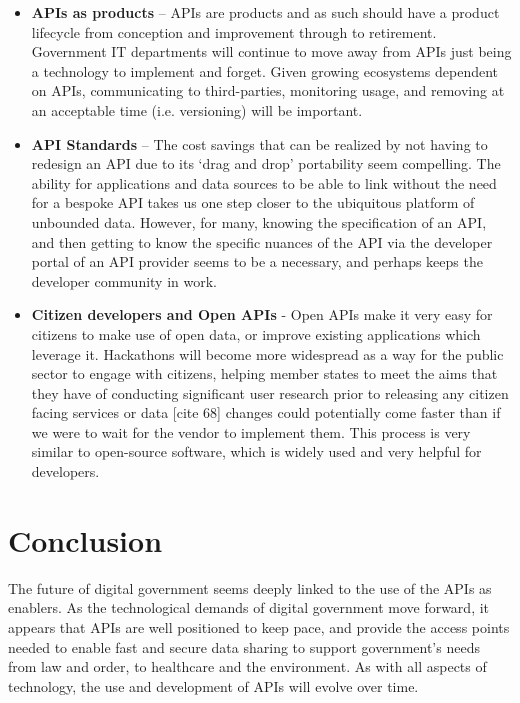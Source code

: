 \begin{itemize}
	\item \textbf{APIs as products} – APIs are products and as such should have a
	product lifecycle from conception and improvement through to retirement.
	Government IT departments will continue to move away from APIs just being
	a technology to implement and forget. Given growing ecosystems dependent
	on APIs, communicating to third-parties, monitoring usage, and removing at
	an acceptable time (i.e. versioning) will be important.
	
	\item \textbf{API Standards} – The cost savings that can be realized by not having
	to redesign an API due to its ‘drag and drop’ portability seem compelling.
	The ability for applications and data sources to be able to link without
	the need for a bespoke API takes us one step closer to the ubiquitous platform
	of unbounded data. However, for many, knowing the specification of an API,
	and then getting to know the specific nuances of the API via the developer
	portal of an API provider seems to be a	necessary, and perhaps keeps the
	developer community in work.
	
	\item \textbf{Citizen developers and Open APIs} - Open APIs make it very easy for
	citizens to make use of	open data, or improve existing applications which
	leverage it. Hackathons will become more widespread as a way for the public
	sector to engage with citizens, helping member states to meet the aims that
	they have of conducting significant user research prior to releasing any
	citizen facing services or data [cite 68] changes could potentially come
	faster than if we were to wait for the vendor to implement them. This process
	is very similar to open-source software, which is widely used and very
	helpful for developers.
\end{itemize}

\section{Conclusion}

The future of digital government seems deeply linked to the use of the APIs as
enablers. As the technological demands of digital government move forward, it
appears that APIs are well positioned to keep pace, and provide the access points
needed to enable fast and secure data sharing to support government’s needs from
law and order, to healthcare and the environment. As with all aspects of technology,
the use and development of APIs will evolve over time.